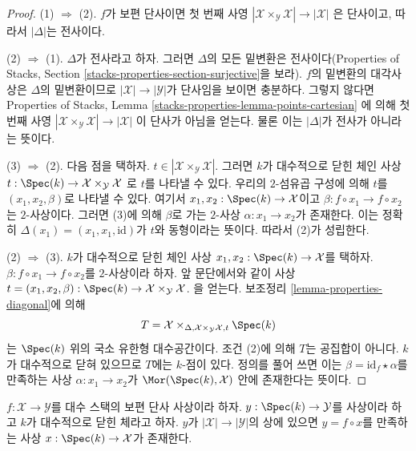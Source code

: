 \begin{proof}
(1) $\Rightarrow$ (2). $f$가 보편 단사이면 첫 번째 사영
$|\mathcal{X} \times_\mathcal{Y} \mathcal{X}| \to |\mathcal{X}|$
은 단사이고, 따라서 $|\Delta|$는 전사이다.

\medskip\noindent
(2) $\Rightarrow$ (1). $\Delta$가 전사라고 하자. 그러면
$\Delta$의 모든 밑변환은 전사이다(Properties of Stacks, Section
\ref{stacks-properties-section-surjective}을 보라).
$f$의 밑변환의 대각사상은 $\Delta$의 밑변환이므로
$|\mathcal{X}| \to |\mathcal{Y}|$가 단사임을 보이면 충분하다.
그렇지 않다면 Properties of Stacks, Lemma
\ref{stacks-properties-lemma-points-cartesian}
에 의해 첫 번째 사영
$|\mathcal{X} \times_\mathcal{Y} \mathcal{X}| \to |\mathcal{X}|$
이 단사가 아님을 얻는다. 물론 이는 $|\Delta|$가 전사가 아니라는 뜻이다.

\medskip\noindent
(3) $\Rightarrow$ (2). 다음 점을 택하자.
$t \in |\mathcal{X} \times_\mathcal{Y} \mathcal{X}|$.
그러면 $k$가 대수적으로 닫힌 체인 사상
$t : \Spec(k) \to \mathcal{X} \times_\mathcal{Y} \mathcal{X}$
로 $t$를 나타낼 수 있다. 우리의 $2$-섬유곱 구성에 의해 $t$를
$(x_1, x_2, \beta)$로 나타낼 수 있다. 여기서
$x_1, x_2 : \Spec(k) \to \mathcal{X}$이고
$\beta : f \circ x_1 \to f \circ x_2$는 $2$-사상이다.
그러면 (3)에 의해 $\beta$로 가는 $2$-사상
$\alpha : x_1 \to x_2$가 존재한다. 이는 정확히
$\Delta(x_1) = (x_1, x_1, \text{id})$가 $t$와 동형이라는 뜻이다.
따라서 (2)가 성립한다.

\medskip\noindent
(2) $\Rightarrow$ (3). $k$가 대수적으로 닫힌 체인 사상
$x_1, x_2 : \Spec(k) \to \mathcal{X}$를 택하자.
$\beta : f \circ x_1 \to f \circ x_2$를 $2$-사상이라 하자.
앞 문단에서와 같이 사상
$t = (x_1, x_2, \beta) :
\Spec(k) \to \mathcal{X} \times_\mathcal{Y} \mathcal{X}$.
을 얻는다. 보조정리 \ref{lemma-properties-diagonal}에 의해
$$
T = \mathcal{X}
\times_{\Delta, \mathcal{X} \times_\mathcal{Y} \mathcal{X}, t} \Spec(k)
$$
는 $\Spec(k)$ 위의 국소 유한형 대수공간이다. 조건 (2)에 의해
$T$는 공집합이 아니다. $k$가 대수적으로 닫혀 있으므로 $T$에는
$k$-점이 있다. 정의를 풀어 쓰면 이는
$\beta = \text{id}_f \star \alpha$를 만족하는 사상
$\alpha : x_1 \to x_2$가 $\Mor(\Spec(k), \mathcal{X})$ 안에 존재한다는
뜻이다.
\end{proof}

\begin{lemma}
\label{lemma-universally-injective-point}
$f : \mathcal{X} \to \mathcal{Y}$를 대수 스택의 보편 단사 사상이라 하자.
$y : \Spec(k) \to \mathcal{Y}$를 사상이라 하고 $k$가 대수적으로 닫힌
체라고 하자. $y$가 $|\mathcal{X}| \to |\mathcal{Y}|$의 상에 있으면
$y = f \circ x$를 만족하는 사상 $x : \Spec(k) \to \mathcal{X}$가 존재한다.
\end{lemma}

